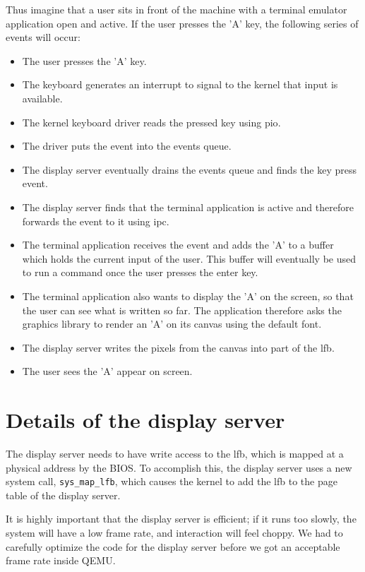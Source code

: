 \documentclass{report}
\begin{document}
Thus imagine that a user sits in front of the machine with a terminal emulator
application open and active. If the user presses the 'A' key, the following
series of events will occur: 
\begin{itemize}
\item The user presses the 'A' key.
\item The keyboard generates an interrupt to signal to the kernel that input
is available.
\item The kernel keyboard driver reads the pressed key using \gls{pio}.
\item The driver puts the event into the events queue.
\item The display server eventually drains the events queue and finds the key
press event.
\item The display server finds that the terminal application is active and
therefore forwards the event to it using \gls{ipc}.
\item The terminal application receives the event and adds the 'A' to a buffer
which holds the current input of the user. This buffer will eventually be used
to run a command once the user presses the enter key.
\item The terminal application also wants to display the 'A' on the screen, so
that the user can see what is written so far. The application therefore asks
the graphics library to render an 'A' on its canvas using the default font.
\item The display server writes the pixels from the canvas into part of the
\gls{lfb}.
\item The user sees the 'A' appear on screen.
\end{itemize}



\section{Details of the display server}
The display server needs to have write access to the \gls{lfb}, which is
mapped at a physical address by the BIOS. To accomplish this, the display
server uses a new system call, \texttt{sys\_map\_lfb}, which causes the kernel
to add the \gls{lfb} to the page table of the display server.

It is highly important that the display server is efficient; if it runs too
slowly, the system will have a low frame rate, and interaction will feel
choppy. We had to carefully optimize the code for the display server before we
got an acceptable frame rate inside QEMU.
\end{document}
